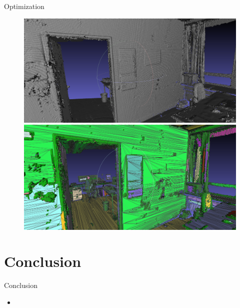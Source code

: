 \documentclass{beamer}
\begin{document}
\begin{frame}{Optimization}
	\begin{figure}
   		\centering
   		\includegraphics[height=0.39\textheight]{police_mesh.png}\\
   		\vspace{0.1cm}
   		\includegraphics[height=0.39\textheight]{police_opt_mesh.png}
  	\end{figure}
\end{frame}

\section{Conclusion}

\begin{frame}{Conclusion}
	\begin{itemize}
		\item
	\end{itemize}
\end{frame}
\end{document}
